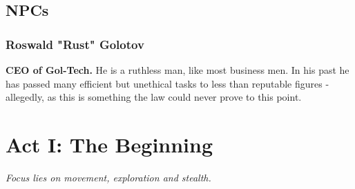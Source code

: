 \documentclass[12pt,a4paper,openany]{book}
\begin{document}
	\section{NPCs}
		\subsection{Roswald "Rust" Golotov}
		\textbf{CEO of Gol-Tech.}
		He is a ruthless man, like most business men. In his past he has passed many efficient but unethical tasks to less than reputable figures - allegedly, as this is something the law could never prove to this point.
	
	\chapter{Act I: The Beginning}
	\textit{Focus lies on movement, exploration and stealth.}
	\par
	
	
\end{document}
